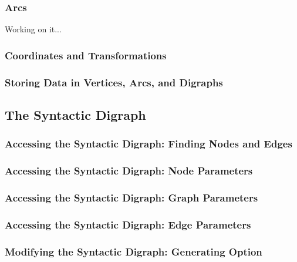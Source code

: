 \subsubsection{Arcs}
\label{section-gd-arc-model}

Working on it...


\subsubsection{Coordinates and Transformations}


\subsubsection{Storing Data in Vertices, Arcs, and Digraphs}



\subsection{The Syntactic Digraph}

\label{section-gd-syntactic-digraph}


\subsubsection{Accessing the Syntactic Digraph: Finding Nodes and Edges}

\subsubsection{Accessing the Syntactic Digraph: Node Parameters}

\subsubsection{Accessing the Syntactic Digraph: Graph Parameters}

\subsubsection{Accessing the Syntactic Digraph: Edge Parameters}

\subsubsection{Modifying the Syntactic Digraph: Generating Option}

